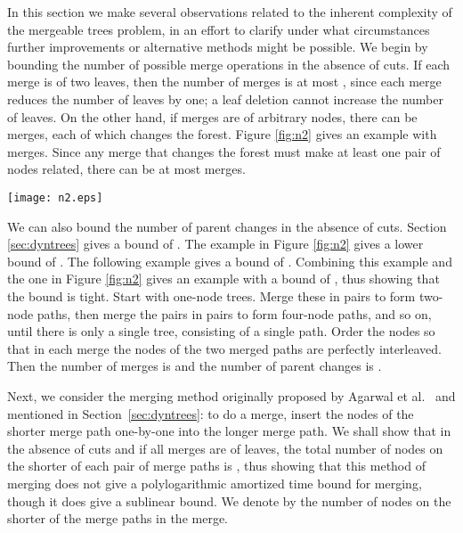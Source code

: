 \documentclass[twoside,leqno,twocolumn]{article}
\begin{document}
In this section we make several observations related to the inherent complexity of the mergeable trees problem, in an effort to clarify under what circumstances further improvements or alternative methods might be possible.  We begin by bounding the number of possible merge operations in the absence of cuts.  If each merge is of two leaves, then the number of merges is at most , since each merge reduces the number of leaves by one; a leaf deletion cannot increase the number of leaves.  On the other hand, if merges are of arbitrary nodes, there can be  merges, each of which changes the forest.  Figure \ref{fig:n2} gives an example with  merges.  Since any merge that changes the forest must make at least one pair of nodes related, there can be at most  merges.

\begin{figure*}
\begin{center}
\resizebox{1\textwidth}{!} {\texttt{[image: n2.eps]}}
\end{center}
\caption{\label{fig:n2} An example with  merges. The
sequence of merges consists of  rounds, each with  merges;
the  merge of round  merges nodes  and . The
number of nodes is . Figure \ref{fig:n2}(a) is the initial tree,
Figure \ref{fig:n2}(b) is the tree after the first round of  merges, and
Figure \ref{fig:n2}(c) is the tree after all  merges.}
\end{figure*}

We can also bound the number of parent changes in the absence of cuts.  Section \ref{sec:dyntrees} gives a bound of .  The example in Figure \ref{fig:n2} gives a lower bound of .  The following example gives a bound of .  Combining this example and the one in Figure \ref{fig:n2} gives an example with a bound of , thus showing that the  bound is tight. Start with  one-node trees.  Merge these in pairs to form two-node paths, then merge the pairs in pairs to form four-node paths, and so on, until there is only a single tree, consisting of a single path.  Order the nodes so that in each merge the nodes of the two merged paths are perfectly interleaved.  Then the number of merges is  and the number of parent changes is .

Next, we consider the merging method originally proposed by Agarwal et al.~\cite{AEHW06} and mentioned in Section~\ref{sec:dyntrees}: to do a merge, insert the nodes of the shorter merge path one-by-one into the longer merge path.  We shall show that in the absence of cuts and if all merges are of leaves, the total number of nodes on the shorter of each pair of merge paths is , thus showing that this method of merging does not give a polylogarithmic amortized time bound for merging, though it does give a sublinear bound.  We denote by  the number of nodes on the shorter of the merge paths in the  merge.
\end{document}
